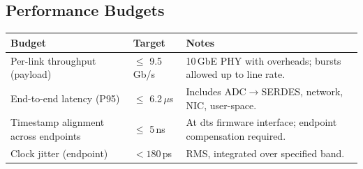 \subsection{Performance Budgets}
\begin{longtable}{@{}p{4.5cm}p{3.2cm}p{7.1cm}@{}}
\toprule
\textbf{Budget} & \textbf{Target} & \textbf{Notes} \\\midrule
Per-link throughput (payload) & $\le$ 9.5\,Gb/s & 10\,GbE PHY with overheads; bursts allowed up to line rate. \\
End-to-end latency (P95) & $\le$ 6.2\,$\mu$s & Includes ADC$\to$SERDES, network, NIC, user-space. \\
Timestamp alignment across endpoints & $\le$ 5\,ns & At \gls{dts} firmware interface; endpoint compensation required. \\
Clock jitter (endpoint) & $<180$\,ps & RMS, integrated over specified band. \\
\bottomrule
\end{longtable}
